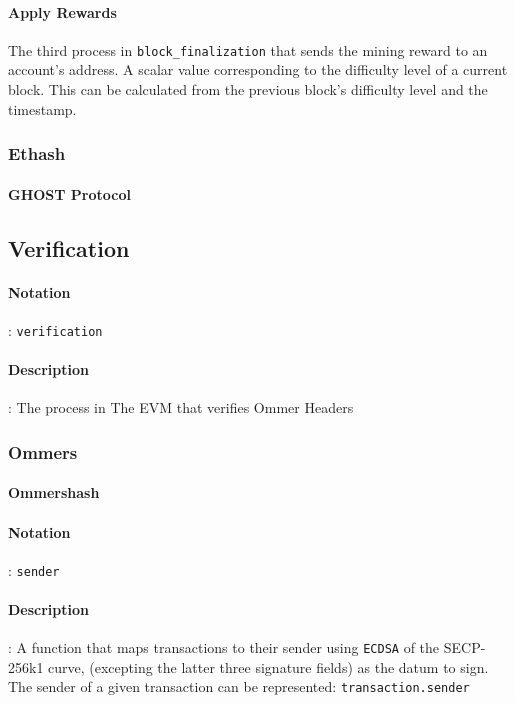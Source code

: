 \documentclass[10pt,a4paper,leqno,bibliography=totoc]{scrartcl}
\newenvironment{alphafootnotes}
{\par\edef\savedfootnotenumber{\number\value{footnote}}
\renewcommand{\thefootnote}{\alph{footnote}}
\setcounter{footnote}{0}}
{\par\setcounter{footnote}{\savedfootnotenumber}}
\begin{document}
\begin{alphafootnotes}
\begin{multicols*}{2}
			\paragraph{Apply Rewards} The third process in \texttt{block\_finalization} that sends the mining reward to an account's address. A scalar value corresponding to the difficulty level of a current block. This can be calculated from the previous block's difficulty level and the timestamp. 

			\subsubsection{Ethash}
	
			\paragraph{GHOST Protocol}

		\subsection{Verification}

					\paragraph{Notation}: \texttt{verification}
					\paragraph{Description}: The process in The EVM that verifies Ommer Headers

			\subsubsection{Ommers}
				\paragraph{Ommershash}


\paragraph{Notation}: \texttt{sender}
\paragraph{Description}: A function that maps transactions to their sender using \texttt{ECDSA} of the SECP-256k1 curve, (excepting the latter three signature fields) as the datum to sign. The sender of a given transaction can be represented:
\texttt{transaction.sender}


\end{multicols*}
\end{alphafootnotes}
\end{document}

